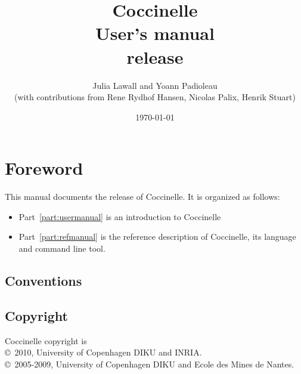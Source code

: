 \documentclass{report}
\begin{document}
\date{}

\title{
{\Huge \bf Coccinelle}\\
{User's manual}\\
{release \cocciversion}\\
}

\author{
Julia Lawall and Yoann Padioleau \\
{(with contributions from
Rene Rydhof Hansen,
Nicolas Palix,
Henrik Stuart)
}
}

\date{\today}

\maketitle
\tableofcontents


\chapter*{Foreword}

This manual documents the release \cocciversion of Coccinelle.
It is organized as follows:
\begin{itemize}
  \item Part~\ref{part:usermanual} is an introduction to Coccinelle
  \item Part~\ref{part:refmanual} is the reference description
    of Coccinelle, its language and command line tool.
\end{itemize}

\section*{Conventions}

\section*{Copyright}

Coccinelle copyright is\\
\copyright~2010, University of Copenhagen DIKU and INRIA.\\
\copyright~2005-2009, University of Copenhagen DIKU and Ecole des Mines de Nantes.
\end{document}
